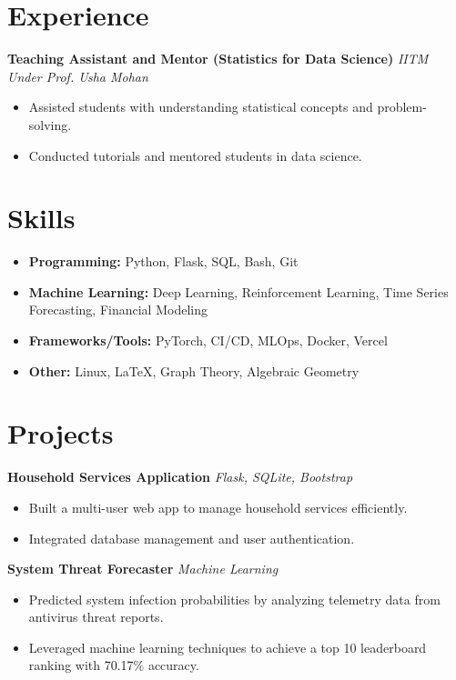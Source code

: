 \documentclass[a4paper,10pt]{article}
\begin{document}
\section*{Experience}
\textbf{Teaching Assistant and Mentor (Statistics for Data Science)} \hfill \textit{IITM} \\
\textit{Under Prof. Usha Mohan} \\
\begin{itemize}[left=0.15in]
    \item Assisted students with understanding statistical concepts and problem-solving.
    \item Conducted tutorials and mentored students in data science.
\end{itemize}

\section*{Skills}
\begin{itemize}[left=0.15in]
    \item \textbf{Programming:} Python, Flask, SQL, Bash, Git
    \item \textbf{Machine Learning:} Deep Learning, Reinforcement Learning, Time Series Forecasting, Financial Modeling
    \item \textbf{Frameworks/Tools:} PyTorch, CI/CD, MLOps, Docker, Vercel
    \item \textbf{Other:} Linux, LaTeX, Graph Theory, Algebraic Geometry
\end{itemize}

\section*{Projects}
\textbf{Household Services Application} \hfill \textit{Flask, SQLite, Bootstrap} \\
\begin{itemize}[left=0.15in]
    \item Built a multi-user web app to manage household services efficiently.
    \item Integrated database management and user authentication.
\end{itemize}

\textbf{System Threat Forecaster} \hfill \textit{Machine Learning} \\
\begin{itemize}[left=0.15in]
    \item Predicted system infection probabilities by analyzing telemetry data from antivirus threat reports.
    \item Leveraged machine learning techniques to achieve a top 10 leaderboard ranking with 70.17\% accuracy.
\end{itemize}
\end{document}
